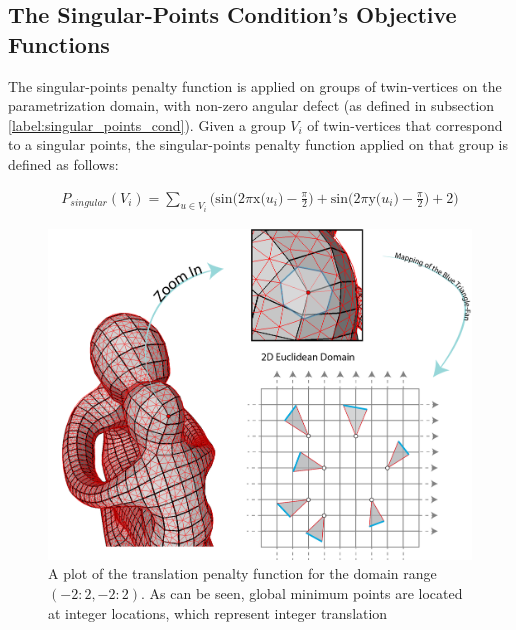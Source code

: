 \subsection{The Singular-Points Condition's Objective Functions}
The singular-points penalty function is applied on groups of twin-vertices on the parametrization domain, with non-zero angular defect (as defined in subsection \ref{label:singular_points_cond}). Given a group $V_i$ of twin-vertices that correspond to a singular points, the singular-points penalty function applied on that group is defined as follows:

\begin{equation}\label{eq:singular_points_penalty}
\begin{split}
P_{singular}\left(V_i\right) = \sum_{u \in V_i} \bigg( \mathrm{sin} \Big( 2\pi\mathrm{x}\big(u_i\big) - \frac{\pi}{2}\Big) + \mathrm{sin} \Big( 2\pi\mathrm{y}\big(u_i\big) - \frac{\pi}{2}\Big) + 2 \bigg)
\end{split}
\end{equation}

\begin{figure}[ht]
\centering
\includegraphics[width=16cm]{figures/singular_points/singular_points_penalty.png}
\caption[Translation Penalty Function]{A plot of the translation penalty function for the domain range $\left(-2:2, -2:2\right)$. As can be seen, global minimum points are located at integer locations, which represent integer translation}
\label{fig:singular_points_penalty}
\end{figure}